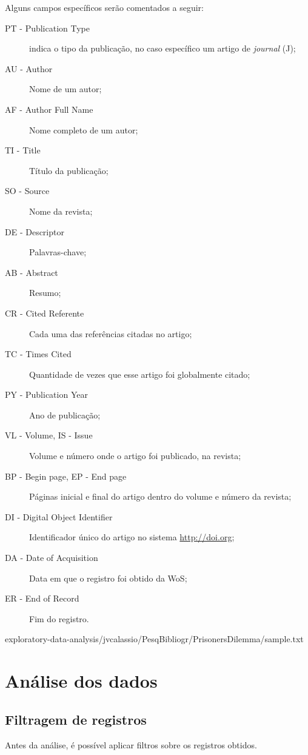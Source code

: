 Alguns campos específicos serão comentados a seguir:
\begin{description}
    \item [PT - Publication Type] indica o tipo da publicação, no caso específico um artigo de \textit{journal} (J);
    \item [AU - Author] Nome de um autor;
    \item [AF - Author Full Name] Nome completo de um autor;
    \item [TI - Title] Título da publicação;
    \item [SO - Source] Nome da revista;
    \item [DE - Descriptor] Palavras-chave;
    \item [AB - Abstract] Resumo;
    \item [CR - Cited Referente] Cada uma das referências citadas no artigo;
    \item [TC - Times Cited] Quantidade de vezes que esse artigo foi globalmente citado;
    \item [PY - Publication Year] Ano de publicação;
    \item [VL - Volume, IS - Issue] Volume e número onde o artigo foi publicado, na revista;
    \item [BP - Begin page, EP - End page] Páginas inicial e final do artigo dentro do volume e número da revista;
    \item [DI - Digital Object Identifier] Identificador único do artigo no sistema \url{http://doi.org};
    \item [DA - Date of Acquisition] Data em que o registro foi obtido da WoS;
    \item [ER - End of Record] Fim do registro.
\end{description}


{exploratory-data-analysis/jvcalassio/PesqBibliogr/PrisonersDilemma/sample.txt}

\section{Análise dos dados\label{PD@jvcalassio:analise}}

\subsection{Filtragem de registros}
Antes da análise, é possível aplicar filtros sobre os registros obtidos.

